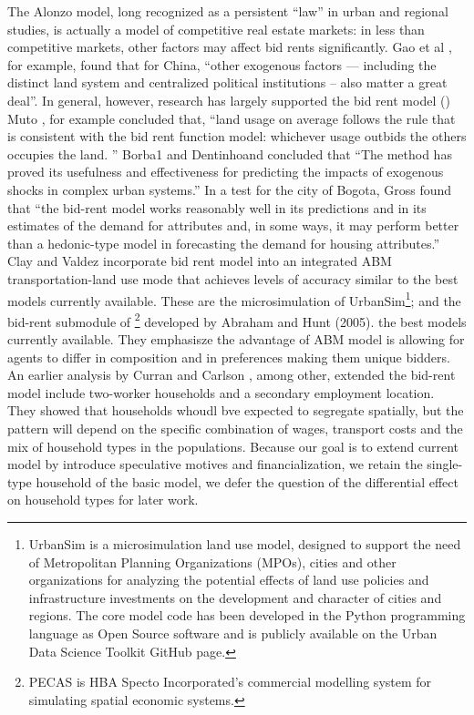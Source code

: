 The Alonzo model, long  recognized as a persistent ``law'' in urban and regional studies, is actually a model of competitive real estate markets: in less than competitive markets, other factors may affect bid rents significantly.
Gao et al \cite{GaoJinlong2020BtbT}, for example,  found  that for China, ``other  exogenous  factors –– including  the  distinct  land  system  and  centralized  political  institutions -- also matter a great deal''. In general, however, 
research has largely supported the bid rent model (\cite{mutoEstimationBidRent2006, wheatonBidRentApproach1977}) Muto \cite{mutoEstimationBidRent2006}, for example concluded that,  ``land usage on average follows the rule that is consistent with the bid rent function model: whichever usage outbids the others occupies the land. ''  Borba1 and Dentinhoand \cite{borbaEvaluationUrbanScenarios2016} concluded that ``The method has proved its usefulness and effectiveness for predicting the impacts of exogenous shocks in complex urban systems.'' 
%
In a test for the city of Bogota, Gross \cite{grossEstimatingWillingnessPay1988} found that  ``the bid-rent model works reasonably well in its predictions and in its estimates of the demand for attributes and, in some ways, it may perform better than a hedonic-type model in forecasting the demand for housing attributes.'' 
%
Clay and Valdez incorporate bid rent model into an integrated ABM transportation-land use mode that achieves levels of accuracy similar to the best models currently available. These are the microsimulation of UrbanSim\footnote{UrbanSim is a microsimulation land use model, designed to support the need of Metropolitan Planning Organizations (MPOs), cities and other organizations for analyzing the potential effects of land use policies and infrastructure investments on the development and character of cities and regions. The core model code has been developed in the Python programming language as Open Source software and is publicly available on the Urban Data Science Toolkit GitHub page.\cite{waddellmodellinurbandev2002}}; and the bid-rent submodule of \footnote{PECAS is  HBA Specto Incorporated's commercial modelling system  for simulating spatial economic systems.} developed by Abraham and Hunt (2005). the best models currently available. They emphasisze the advantage of ABM model is allowing for agents to differ in composition and in preferences making them unique bidders. 
An earlier analysis by Curran and Carlson \cite{curranTheoryResidentialLocation1982}, among other, extended the bid-rent model include two-worker households and a secondary employment location. They showed that households whoudl bve expected to segregate spatially, but the pattern will depend on the specific combination of wages, transport costs and the mix of household types in the populations. 
Because our goal  is to extend current model by introduce speculative motives and financialization, we retain the single-type household of the basic model, we defer the  question of the differential effect on household types for later work.  
%

